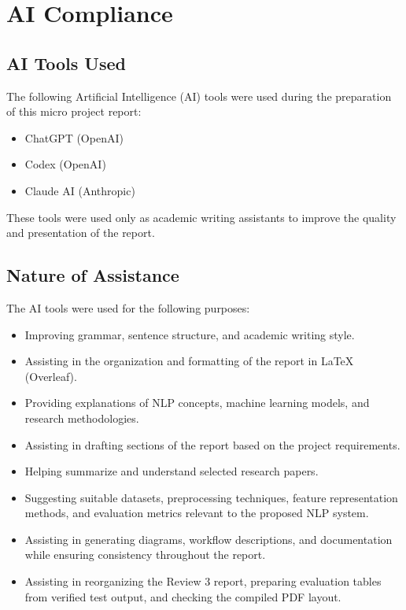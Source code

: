 \chapter{AI Compliance}


\section{AI Tools Used}

The following Artificial Intelligence (AI) tools were used during the preparation of this micro project report:

\begin{itemize}
    \item ChatGPT (OpenAI)
    \item Codex (OpenAI)
    \item Claude AI (Anthropic)
\end{itemize}

These tools were used only as academic writing assistants to improve the quality and presentation of the report.


\section{Nature of Assistance}

The AI tools were used for the following purposes:

\begin{itemize}
    \item Improving grammar, sentence structure, and academic writing style.
    \item Assisting in the organization and formatting of the report in \LaTeX{} (Overleaf).
    \item Providing explanations of NLP concepts, machine learning models, and research methodologies.
    \item Assisting in drafting sections of the report based on the project requirements.
    \item Helping summarize and understand selected research papers.
    \item Suggesting suitable datasets, preprocessing techniques, feature representation methods, and evaluation metrics relevant to the proposed NLP system.
    \item Assisting in generating diagrams, workflow descriptions, and documentation while ensuring consistency throughout the report.
    \item Assisting in reorganizing the Review 3 report, preparing evaluation tables from verified test output, and checking the compiled PDF layout.
\end{itemize}

